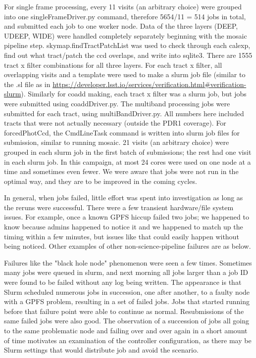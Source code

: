 \documentclass[DM,authoryear,toc]{lsstdoc}
\begin{document}
For single frame processing, every 11 visits (an arbitrary choice) were grouped into one singleFrameDriver.py command, therefore 5654/11 = 514 jobs in total, and submitted each job to one worker node.  Data of the three layers (DEEP, UDEEP, WIDE) were handled completely separately beginning with the mosaic pipeline step.  skymap.findTractPatchList was used to check through each calexp, find out what tract/patch the ccd overlaps, and write into sqlite3. There are 1555 tract x filter combinations for all three layers. For each tract x filter, all overlapping visits and a template were used to make a slurm job file (similar to the .sl file as in \url{https://developer.lsst.io/services/verification.html#verification-slurm}). Similarly for coadd making, each tract x filter was a slurm job, but jobs were submitted using coaddDriver.py.  The multiband processing jobs were submitted for each tract, using multiBandDriver.py.   All numbers here included tracts that were not actually necessary (outside the PDR1 coverage).  For forcedPhotCcd, the CmdLineTask command is written into slurm job files for submission, similar to running mosaic. 21 visits (an arbitrary choice) were grouped in each slurm job in the first batch of submissions; the rest had one visit in each slurm job. In this campaign, at most 24 cores were used on one node at a time and sometimes even fewer.   We were aware that jobs were not run in the optimal way, and they are to be improved in the coming cycles.

In general, when jobs failed, little effort was spent into investigation as long as the reruns were successful. There were a few transient hardware/file system issues. For example, once a known GPFS hiccup failed two jobs; we happened to know because admins happened to notice it and we happened to match up the timing within a few minutes, but issues like that could easily happen without being noticed.  Other examples of other non-science-pipeline failures are as below.

Failures like the "black hole node" phenomenon were seen a few times. Sometimes many jobs were queued in slurm, and next morning all jobs larger than a job ID were found to be failed without any log being written.  The appearance is that Slurm scheduled numerous jobs in succession, one after another, to a faulty node with a GPFS problem, resulting in a set of failed jobs.   Jobs that started running before that failure point were able to continue as normal. Resubmissions of the same failed jobs were also good.   The observation of a succession of jobs all going to the same problematic node and failing over and over again in a short amount of time motivates an examination of the controller configuration, as there may be Slurm settings that would distribute job and avoid the scenario.
\end{document}
